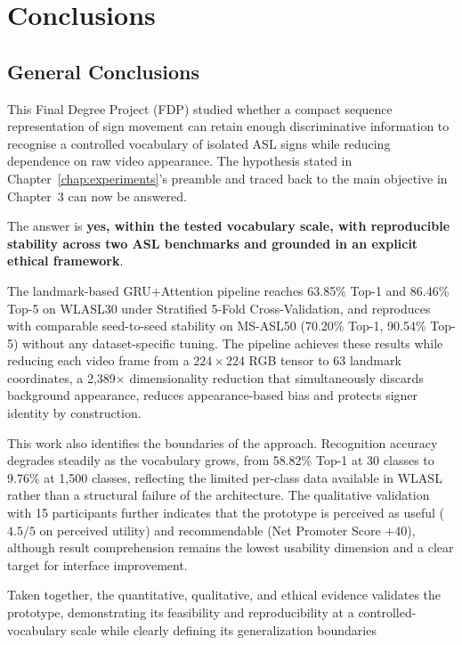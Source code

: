 \chapter{Conclusions}
\setcounter{section}{0}

\section{General Conclusions}

This Final Degree Project (FDP) studied whether a compact sequence representation of sign movement
can retain enough discriminative information to recognise a controlled vocabulary of isolated ASL
signs while reducing dependence on raw video appearance. The hypothesis stated in
Chapter~\ref{chap:experiments}'s preamble and traced back to the main objective in Chapter~3 can
now be answered.

The answer is \textbf{yes, within the tested vocabulary scale, with reproducible stability across
two ASL benchmarks and grounded in an explicit ethical framework}.

The landmark-based GRU+Attention pipeline reaches 63.85\% Top-1 and 86.46\% Top-5 on WLASL30 under
Stratified 5-Fold Cross-Validation, and reproduces with comparable seed-to-seed stability on
MS-ASL50 (70.20\% Top-1, 90.54\% Top-5) without any dataset-specific tuning. The pipeline achieves
these results while reducing each video frame from a $224 \times 224$ RGB tensor to 63 landmark
coordinates, a 2{,}389$\times$ dimensionality reduction that simultaneously discards background
appearance, reduces appearance-based bias and protects signer identity by construction.

This work also identifies the boundaries of the approach. Recognition accuracy degrades steadily as
the vocabulary grows, from 58.82\% Top-1 at 30 classes to 9.76\% at 1{,}500 classes, reflecting the
limited per-class data available in WLASL rather than a structural failure of the architecture. The
qualitative validation with 15 participants further indicates that the prototype is perceived as
useful ($4.5/5$ on perceived utility) and recommendable (Net Promoter Score $+40$), although result
comprehension remains the lowest usability dimension and a clear target for interface improvement.

Taken together, the quantitative, qualitative, and ethical evidence validates the prototype,
demonstrating its feasibility and reproducibility at a controlled-vocabulary scale while clearly
defining its generalization boundaries

